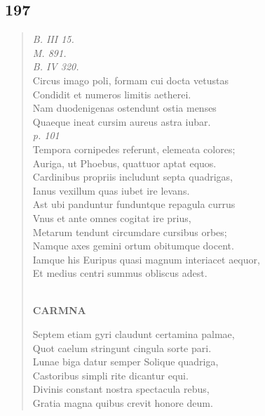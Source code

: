 \documentclass[11pt, a4paper]{report}
\begin{document}
            \subsection*{197}
      \begin{verse}
      \textit{B. III 15.} \\ \textit{M. 891.} \\ \textit{B. IV 320.} \\ Circus imago poli, formam cui docta vetustas \\ Condidit et numeros limitis aetherei. \\ Nam duodenigenas ostendunt ostia menses \\ Quaeque ineat cursim aureus astra iubar. \\ \textit{p. 101} \\ Tempora cornipedes referunt, elemeata colores; \\ Auriga, ut Phoebus, quattuor aptat equos. \\ Cardinibus propriis includunt septa quadrigas, \\ Ianus vexillum quas iubet ire levans. \\ Ast ubi panduntur funduntque repagula currus \\ Vnus et ante omnes cogitat ire prius, \\ Metarum tendunt circumdare cursibus orbes; \\ Namque axes gemini ortum obitumque docent. \\ Iamque his Euripus quasi magnum interiacet aequor, \\ Et medius centri summus obliscus adest. \\ 
        ﻿\pagebreak 
     \marginpar{[162]} \begin{center} \textbf{CARMNA} \end{center}Septem etiam gyri claudunt certamina palmae, \\ Quot caelum stringunt cingula sorte pari. \\ Lunae biga datur semper Solique quadriga, \\ Castoribus simpli rite dicantur equi. \\ Divinis constant nostra spectacula rebus, \\ Gratia magna quibus crevit honore deum. \\ 
      \end{verse}
  
\end{document}
